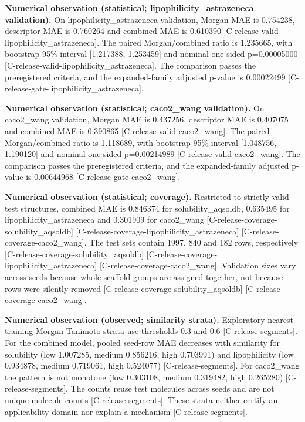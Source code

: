\documentclass[10pt,twocolumn]{article}
\begin{document}
\textbf{Numerical observation (statistical; lipophilicity_astrazeneca validation).} On lipophilicity_astrazeneca validation, Morgan MAE is 0.754238, descriptor MAE is 0.760264 and combined MAE is 0.610390 {\scriptsize[C-release-valid-lipophilicity\_astrazeneca]}. The paired Morgan/combined ratio is 1.235665, with bootstrap 95\% interval [1.217388, 1.253459] and nominal one-sided p=0.00005000 {\scriptsize[C-release-valid-lipophilicity\_astrazeneca]}. The comparison passes the preregistered criteria, and the expanded-family adjusted p-value is 0.00022499 {\scriptsize[C-release-gate-lipophilicity\_astrazeneca]}.

\textbf{Numerical observation (statistical; caco2_wang validation).} On caco2_wang validation, Morgan MAE is 0.437256, descriptor MAE is 0.407075 and combined MAE is 0.390865 {\scriptsize[C-release-valid-caco2\_wang]}. The paired Morgan/combined ratio is 1.118689, with bootstrap 95\% interval [1.048756, 1.190120] and nominal one-sided p=0.00214989 {\scriptsize[C-release-valid-caco2\_wang]}. The comparison passes the preregistered criteria, and the expanded-family adjusted p-value is 0.00644968 {\scriptsize[C-release-gate-caco2\_wang]}.

\textbf{Numerical observation (statistical; coverage).} Restricted to strictly valid test structures, combined MAE is 0.846374 for solubility_aqsoldb, 0.635495 for lipophilicity_astrazeneca and 0.301909 for caco2_wang {\scriptsize[C-release-coverage-solubility\_aqsoldb]} {\scriptsize[C-release-coverage-lipophilicity\_astrazeneca]} {\scriptsize[C-release-coverage-caco2\_wang]}. The test sets contain 1997, 840 and 182 rows, respectively {\scriptsize[C-release-coverage-solubility\_aqsoldb]} {\scriptsize[C-release-coverage-lipophilicity\_astrazeneca]} {\scriptsize[C-release-coverage-caco2\_wang]}. Validation sizes vary across seeds because whole-scaffold groups are assigned together, not because rows were silently removed {\scriptsize[C-release-coverage-solubility\_aqsoldb]} {\scriptsize[C-release-coverage-caco2\_wang]}.

\textbf{Numerical observation (observed; similarity strata).} Exploratory nearest-training Morgan Tanimoto strata use thresholds 0.3 and 0.6 {\scriptsize[C-release-segments]}. For the combined model, pooled seed-row MAE decreases with similarity for solubility (low 1.007285, medium 0.856216, high 0.703991) and lipophilicity (low 0.934878, medium 0.719061, high 0.524077) {\scriptsize[C-release-segments]}. For caco2_wang the pattern is not monotone (low 0.303108, medium 0.319482, high 0.265280) {\scriptsize[C-release-segments]}. The counts reuse test molecules across seeds and are not unique molecule counts {\scriptsize[C-release-segments]}. These strata neither certify an applicability domain nor explain a mechanism {\scriptsize[C-release-segments]}.
\end{document}
